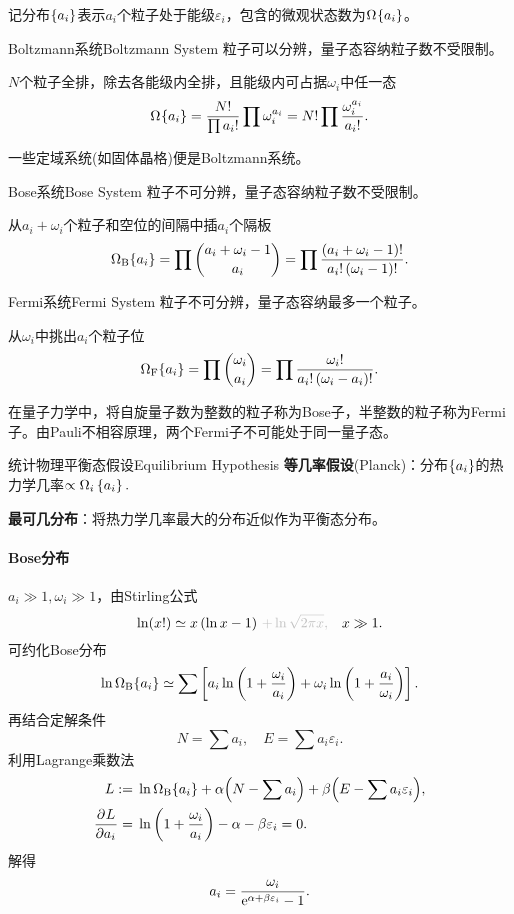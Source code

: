 记分布$\hkh{a_i}$表示$a_i$个粒子处于能级$\varepsilon_i$，包含的微观状态数为$\Om$。
\begin{definition}{Boltzmann系统}{Boltzmann System}
	粒子可以分辨，量子态容纳粒子数不受限制。

	$N$个粒子全排，除去各能级内全排，且能级内可占据$\omega_i$中任一态
	\begin{align}
		\Om=\frac{N!}{\prod a_i!}\prod\omega_i^{a_i}=N!\prod\frac{\omega_i^{a_i}}{a_i!}.
	\end{align}
\end{definition}
一些定域系统(如固体晶格)便是Boltzmann系统。
\begin{definition}{Bose系统}{Bose System}
	粒子不可分辨，量子态容纳粒子数不受限制。

	从$a_i+\omega_i$个粒子和空位的间隔中插$a_i$个隔板
	\begin{align}
		\Om[B]=\prod\binom{a_i+\omega_i-1}{a_i}=\prod\frac{\kh{a_i+\omega_i-1}!}{a_i!\kh{\omega_i-1}!}.
	\end{align}
\end{definition}
\begin{definition}{Fermi系统}{Fermi System}
	粒子不可分辨，量子态容纳最多一个粒子。

	从$\omega_i$中挑出$a_i$个粒子位
	\begin{align}
		\Om[F]=\prod\binom{\omega_i}{a_i}=\prod\frac{\omega_i!}{a_i!\kh{\omega_i-a_i}!}.
	\end{align}
\end{definition}
在量子力学中，将自旋量子数为整数的粒子称为Bose子，半整数的粒子称为Fermi子。由Pauli不相容原理，两个Fermi子不可能处于同一量子态。 
\begin{theorem}{统计物理平衡态假设}{Equilibrium Hypothesis}
	\textbf{等几率假设}(Planck)：分布$\hkh{a_i}$的热力学几率$\propto\Omega_i\hkh{a_i}.$

	\textbf{最可几分布}：将热力学几率最大的分布近似作为平衡态分布。
\end{theorem}
\paragraph{Bose分布}
$a_i\gg 1,\omega_i\gg 1$，由Stirling公式
\[
	\ln(x!)\simeq x\kh{\ln x-1}\,{\color{lightgray}+\ln\sqrt{2\pi x},}\quad x\gg 1.
\]
可约化Bose分布
\begin{align*}
	\ln\Om[B]\simeq\sum\fkh{a_i\ln\kh{1+\frac{\omega_i}{a_i}}+\omega_i\ln\kh{1+\frac{a_i}{\omega_i}}}.
\end{align*}
再结合定解条件
\[
	N=\sum a_i,\quad E=\sum a_i\varepsilon_i.
\]
利用Lagrange乘数法
\begin{align*}
	L:={}&\ln\Om[B]+\alpha\Bigkh{N-\sum a_i}+\beta\Bigkh{E-\sum a_i\varepsilon_i},\\
	\pv L{a_i}={}&\ln\kh{1+\frac{\omega_i}{a_i}}-\alpha-\beta\varepsilon_i=0.
\end{align*}
解得
\begin{align}
	a_i=\frac{\omega_i}{\e{\alpha+\beta\varepsilon_i}-1}.
\end{align}

